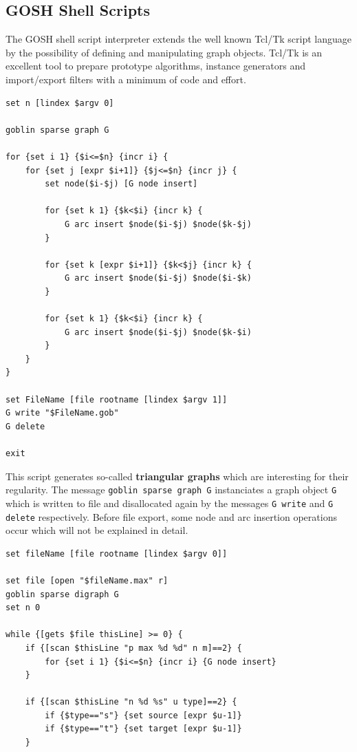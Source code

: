 \documentclass[a4paper,11pt,twoside]{book}
\begin{document}
\begin{multicols}{2}
\section{GOSH Shell Scripts}

The GOSH shell script interpreter extends the well known Tcl/Tk script
language by the possibility of defining and manipulating graph objects.
Tcl/Tk is an excellent tool to prepare prototype algorithms, instance
generators and import/export filters with a minimum of code and effort.
\begin{mysample}
\begin{verbatim}
set n [lindex $argv 0]

goblin sparse graph G

for {set i 1} {$i<=$n} {incr i} {
    for {set j [expr $i+1]} {$j<=$n} {incr j} {
        set node($i-$j) [G node insert]

        for {set k 1} {$k<$i} {incr k} {
            G arc insert $node($i-$j) $node($k-$j)
        }

        for {set k [expr $i+1]} {$k<$j} {incr k} {
            G arc insert $node($i-$j) $node($i-$k)
        }

        for {set k 1} {$k<$i} {incr k} {
            G arc insert $node($i-$j) $node($k-$i)
        }
    }
}

set FileName [file rootname [lindex $argv 1]]
G write "$FileName.gob"
G delete

exit
\end{verbatim}
\end{mysample}
This script generates so-called {\bf triangular graphs}
which are interesting for their regularity. The message
\verb/goblin sparse graph G/ instanciates a graph object \verb/G/ which is
written to file and
disallocated again by the messages \verb/G write/ and \verb/G delete/
respectively. Before file export, some node and arc insertion operations occur
which will not be explained in detail.
\begin{mysample}
\begin{verbatim}
set fileName [file rootname [lindex $argv 0]]

set file [open "$fileName.max" r]
goblin sparse digraph G
set n 0

while {[gets $file thisLine] >= 0} {
    if {[scan $thisLine "p max %d %d" n m]==2} {
        for {set i 1} {$i<=$n} {incr i} {G node insert}
    }

    if {[scan $thisLine "n %d %s" u type]==2} {
        if {$type=="s"} {set source [expr $u-1]}
        if {$type=="t"} {set target [expr $u-1]}
    }


\end{verbatim}
\end{mysample}
\end{multicols}
\end{document}
